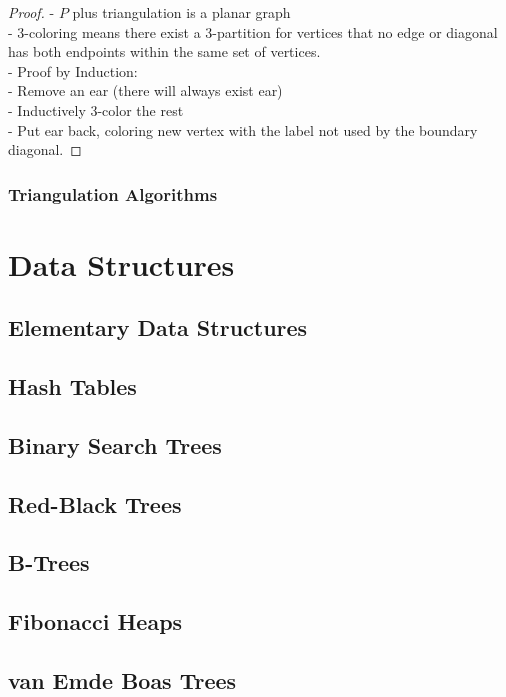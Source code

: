 				\begin{proof}
					- $P$ plus triangulation is a planar graph\\
					- 3-coloring means there exist a 3-partition for vertices that no edge or diagonal has both endpoints within the same set of vertices.\\
					- Proof by Induction:\\
					\indent - Remove an ear (there will always exist ear) \\
					\indent - Inductively 3-color the rest\\
					\indent - Put ear back, coloring new vertex with the label not used by the boundary diagonal.
				\end{proof}

			\subsection{Triangulation Algorithms}

	\chapter{Data Structures}
		\section{Elementary Data Structures}

		\section{Hash Tables}

		\section{Binary Search Trees}

		\section{Red-Black Trees}

		\section{B-Trees}

		\section{Fibonacci Heaps}

		\section{van Emde Boas Trees}

